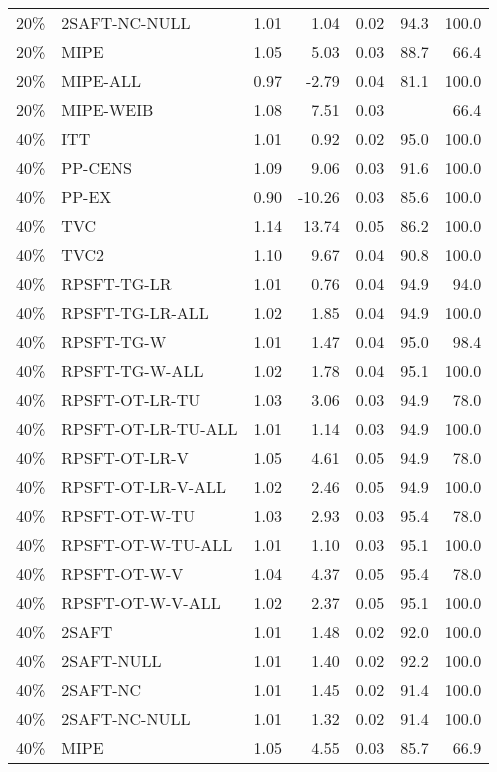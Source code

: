 \begin{table}[ht]
{\begin{tabular}{llrrrrr}
  20\% & 2SAFT-NC-NULL & 1.01 & 1.04 & 0.02 & 94.3 & 100.0 \\ 
  20\% & MIPE & 1.05 & 5.03 & 0.03 & 88.7 & 66.4 \\ 
  20\% & MIPE-ALL & 0.97 & -2.79 & 0.04 & 81.1 & 100.0 \\ 
  20\% & MIPE-WEIB & 1.08 & 7.51 & 0.03 &  & 66.4 \\ 
   \hline
40\% & ITT & 1.01 & 0.92 & 0.02 & 95.0 & 100.0 \\ 
  40\% & PP-CENS & 1.09 & 9.06 & 0.03 & 91.6 & 100.0 \\ 
  40\% & PP-EX & 0.90 & -10.26 & 0.03 & 85.6 & 100.0 \\ 
  40\% & TVC & 1.14 & 13.74 & 0.05 & 86.2 & 100.0 \\ 
  40\% & TVC2 & 1.10 & 9.67 & 0.04 & 90.8 & 100.0 \\ 
   \hline
40\% & RPSFT-TG-LR & 1.01 & 0.76 & 0.04 & 94.9 & 94.0 \\ 
  40\% & RPSFT-TG-LR-ALL & 1.02 & 1.85 & 0.04 & 94.9 & 100.0 \\ 
  40\% & RPSFT-TG-W & 1.01 & 1.47 & 0.04 & 95.0 & 98.4 \\ 
  40\% & RPSFT-TG-W-ALL & 1.02 & 1.78 & 0.04 & 95.1 & 100.0 \\ 
  40\% & RPSFT-OT-LR-TU & 1.03 & 3.06 & 0.03 & 94.9 & 78.0 \\ 
  40\% & RPSFT-OT-LR-TU-ALL & 1.01 & 1.14 & 0.03 & 94.9 & 100.0 \\ 
  40\% & RPSFT-OT-LR-V & 1.05 & 4.61 & 0.05 & 94.9 & 78.0 \\ 
  40\% & RPSFT-OT-LR-V-ALL & 1.02 & 2.46 & 0.05 & 94.9 & 100.0 \\ 
   \hline
40\% & RPSFT-OT-W-TU & 1.03 & 2.93 & 0.03 & 95.4 & 78.0 \\ 
  40\% & RPSFT-OT-W-TU-ALL & 1.01 & 1.10 & 0.03 & 95.1 & 100.0 \\ 
  40\% & RPSFT-OT-W-V & 1.04 & 4.37 & 0.05 & 95.4 & 78.0 \\ 
  40\% & RPSFT-OT-W-V-ALL & 1.02 & 2.37 & 0.05 & 95.1 & 100.0 \\ 
   \hline
40\% & 2SAFT & 1.01 & 1.48 & 0.02 & 92.0 & 100.0 \\ 
  40\% & 2SAFT-NULL & 1.01 & 1.40 & 0.02 & 92.2 & 100.0 \\ 
  40\% & 2SAFT-NC & 1.01 & 1.45 & 0.02 & 91.4 & 100.0 \\ 
  40\% & 2SAFT-NC-NULL & 1.01 & 1.32 & 0.02 & 91.4 & 100.0 \\ 
  40\% & MIPE & 1.05 & 4.55 & 0.03 & 85.7 & 66.9 \\ 

\end{tabular}}
\end{table}
